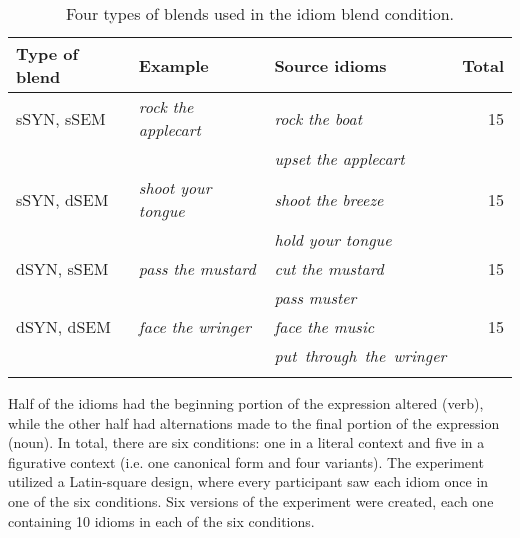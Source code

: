 \documentclass[output=paper,modfonts,nonflat]{langsci/langscibook}
\begin{document}
\begin{table}

\caption{{Four types of blends used in the idiom blend condition.}}
\label{blendTypes} 
\begin{tabularx}{\textwidth}{XXQr}
\lsptoprule
\bf{Type of blend}&\textbf{Example}&\textbf{Source idioms}&\textbf{Total}\\
\midrule
sSYN, sSEM&\textit{rock the applecart}&\textit{rock the boat}&15\\
&&\textit{upset the applecart}&\\
\tablevspace
sSYN, dSEM&\textit{shoot your tongue}&\textit{shoot the breeze}&15\\
&&\textit{hold your tongue}&\\
\tablevspace
dSYN, sSEM&\textit{pass the mustard}&\textit{cut the mustard}&15\\
&&\textit{pass muster}&\\
\tablevspace
dSYN, dSEM&\textit{face the wringer}&\textit{face the music}&15\\
&&\mbox{\textit{put through the wringer}}&\\
\lspbottomrule
\end{tabularx}
\end{table}


Half of the idioms had the beginning portion of the expression altered (verb), while the other half had alternations made to the final portion of the expression (noun). In total, there are six conditions: one in a literal context and five in a figurative context (i.e. one canonical form and four variants). The experiment utilized a Latin-square design, where every participant saw each idiom once in one of the six conditions. Six versions of the experiment were created, each one containing 10 idioms in each of the six conditions.
\end{document}
